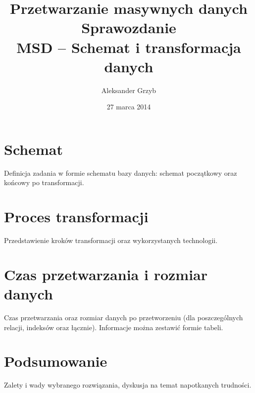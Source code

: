 \documentclass[a4paper,11pt]{article}
\author{Aleksander Grzyb}
\title{Przetwarzanie masywnych danych\\ 
\large{{\bf Sprawozdanie} \\ MSD -- Schemat i transformacja danych}}
\date{27 marca 2014}
\begin{document}
\maketitle 

\section{Schemat}

Definicja zadania w formie schematu bazy danych: schemat początkowy oraz końcowy po transformacji.

\section{Proces transformacji}

Przedstawienie kroków transformacji oraz wykorzystanych technologii.

\section{Czas przetwarzania i rozmiar danych}

Czas przetwarzania oraz rozmiar danych po przetworzeniu (dla poszczególnych relacji, indeksów oraz łącznie). Informacje można zestawić formie tabeli. 

\section{Podsumowanie}

Zalety i wady wybranego rozwiązania, dyskusja na temat napotkanych trudności.
\end{document}

